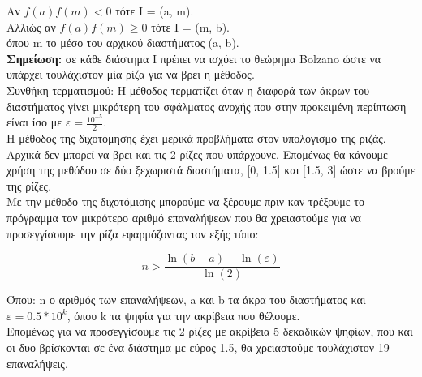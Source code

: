 \documentclass{article}
\begin{document}
\vspace{3mm}
Αν \(f(a)f(m) < 0\) τότε Ι = (a, m). \\

Αλλιώς αν \(f(a)f(m) \geq 0\) τότε Ι = (m, b). \\

όπου m το μέσο του αρχικού διαστήματος (a, b). \\

\textbf{Σημείωση:} σε κάθε διάστημα I πρέπει να ισχύει το θεώρημα Bolzano ώστε να υπάρχει τουλάχιστον μία ρίζα για να βρει η μέθοδος. \\

Συνθήκη τερματισμού: Η μέθοδος τερματίζει όταν η διαφορά των άκρων του διαστήματος γίνει μικρότερη του σφάλματος ανοχής που στην προκειμένη περίπτωση είναι ίσο με \(ε = \frac{10^{-5}}{2}\). \\

Η μέθοδος της διχοτόμησης έχει μερικά προβλήματα στον υπολογισμό της ριζάς. Αρχικά δεν μπορεί να βρει και τις 2 ρίζες που υπάρχουνε. Επομένως θα κάνουμε χρήση της μεθόδου σε δύο ξεχωριστά διαστήματα, [0, 1.5] και [1.5, 3] ώστε να βρούμε της ρίζες. \\

Με την μέθοδο της διχοτόμισης μπορούμε να ξέρουμε πριν καν τρέξουμε το πρόγραμμα τον μικρότερο αριθμό επαναλήψεων που θα χρειαστούμε για να προσεγγίσουμε την ρίζα εφαρμόζοντας τον εξής τύπο: 

\[n > \frac{\ln(b-a) - \ln(ε)}{\ln(2)}\]

Όπου: n ο αριθμός των επαναλήψεων, a και b τα άκρα του διαστήματος και \(ε = 0.5 * 10^k\), όπου k τα ψηφία για την ακρίβεια που θέλουμε. \\

Επομένως για να προσεγγίσουμε τις 2 ρίζες με ακρίβεια 5 δεκαδικών ψηφίων, που και οι δυο βρίσκονται σε ένα διάστημα με εύρος 1.5, θα χρειαστούμε τουλάχιστον 19 επαναλήψεις. \\
\end{document}
